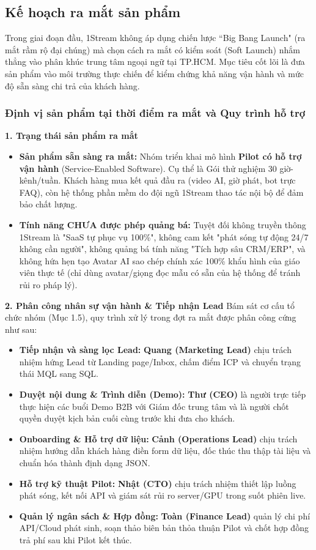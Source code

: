 \subsection{Kế hoạch ra mắt sản phẩm}

Trong giai đoạn đầu, 1Stream không áp dụng chiến lược ``Big Bang Launch" (ra mắt rầm rộ đại chúng) mà chọn cách ra mắt có kiểm soát (Soft Launch) nhắm thẳng vào phân khúc trung tâm ngoại ngữ tại TP.HCM. Mục tiêu cốt lõi là đưa sản phẩm vào môi trường thực chiến để kiểm chứng khả năng vận hành và mức độ sẵn sàng chi trả của khách hàng.

\subsubsection{Định vị sản phẩm tại thời điểm ra mắt và Quy trình hỗ trợ}

\textbf{1. Trạng thái sản phẩm ra mắt}
\begin{itemize}
    \item \textbf{Sản phẩm sẵn sàng ra mắt:} Nhóm triển khai mô hình \textbf{Pilot có hỗ trợ vận hành} (Service-Enabled Software). Cụ thể là Gói thử nghiệm 30 giờ-kênh/tuần. Khách hàng mua kết quả đầu ra (video AI, giờ phát, bot trực FAQ), còn hệ thống phần mềm do đội ngũ 1Stream thao tác nội bộ để đảm bảo chất lượng.
    \item \textbf{Tính năng CHƯA được phép quảng bá:} Tuyệt đối không truyền thông 1Stream là "SaaS tự phục vụ 100\%", không cam kết "phát sóng tự động 24/7 không cần người", không quảng bá tính năng "Tích hợp sâu CRM/ERP", và không hứa hẹn tạo Avatar AI sao chép chính xác 100\% khẩu hình của giáo viên thực tế (chỉ dùng avatar/giọng đọc mẫu có sẵn của hệ thống để tránh rủi ro pháp lý).
\end{itemize}

\textbf{2. Phân công nhân sự vận hành \& Tiếp nhận Lead}
Bám sát cơ cấu tổ chức nhóm (Mục 1.5), quy trình xử lý trong đợt ra mắt được phân công cứng như sau:
\begin{itemize}
    \item \textbf{Tiếp nhận và sàng lọc Lead:} \textbf{Quang (Marketing Lead)} chịu trách nhiệm hứng Lead từ Landing page/Inbox, chấm điểm ICP và chuyển trạng thái MQL sang SQL.
    \item \textbf{Duyệt nội dung \& Trình diễn (Demo):} \textbf{Thư (CEO)} là người trực tiếp thực hiện các buổi Demo B2B với Giám đốc trung tâm và là người chốt quyền duyệt kịch bản cuối cùng trước khi đưa cho khách.
    \item \textbf{Onboarding \& Hỗ trợ dữ liệu:} \textbf{Cảnh (Operations Lead)} chịu trách nhiệm hướng dẫn khách hàng điền form dữ liệu, đốc thúc thu thập tài liệu và chuẩn hóa thành định dạng JSON.
    \item \textbf{Hỗ trợ kỹ thuật Pilot:} \textbf{Nhật (CTO)} chịu trách nhiệm thiết lập luồng phát sóng, kết nối API và giám sát rủi ro server/GPU trong suốt phiên live.
    \item \textbf{Quản lý ngân sách \& Hợp đồng:} \textbf{Toàn (Finance Lead)} quản lý chi phí API/Cloud phát sinh, soạn thảo biên bản thỏa thuận Pilot và chốt hợp đồng trả phí sau khi Pilot kết thúc.
\end{itemize}

